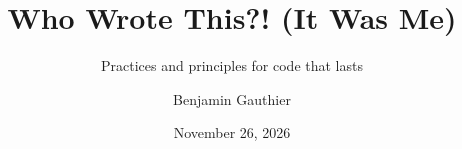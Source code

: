 \documentclass[aspectratio=169,11pt]{beamer}
\title{Who Wrote This?! (It Was Me)}
\subtitle{Practices and principles for code that lasts}
\author{Benjamin Gauthier}
\date{November 26, 2026}
\begin{document}
\begin{frame}[plain]
  \titlepage
\end{frame}







\end{document}
